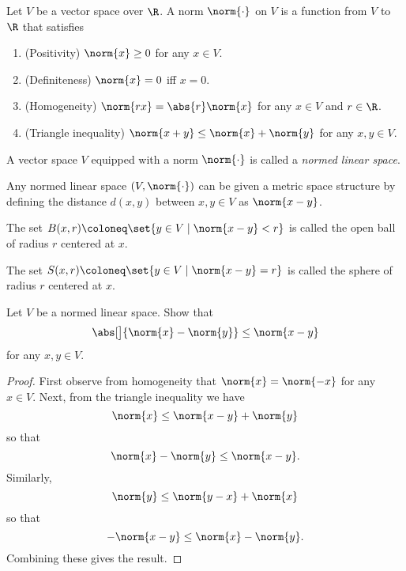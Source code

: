 \begin{definition}[norm] \label{def:norm}
    Let $V$ be a vector space over $\R$.
    A norm $\norm{\cdot}$ on $V$ is a function from $V$ to $\R$ that
    satisfies
    \begin{enumerate}[label=\small(N\arabic*)]
        \item (Positivity) $\norm{x} \ge 0$ for any $x \in V$.
            \label{def:norm:pos}
        \item (Definiteness) $\norm{x} = 0$ iff $x = 0$.
            \label{def:norm:def}
        \item (Homogeneity) $\norm{r x} = \abs{r} \norm{x}$
            for any $x \in V$ and $r \in \R$.
            \label{def:norm:hom}
        \item (Triangle inequality) $\norm{x + y} \le \norm{x} + \norm{y}$
            for any $x, y \in V$.
            \label{def:norm:tri}
    \end{enumerate}
\end{definition}

\begin{definition} \label{def:nls}
    A vector space $V$ equipped with a norm $\norm{\cdot}$ is called
    a \emph{normed linear space}.
\end{definition}

\begin{remark}
    Any normed linear space $(V, \norm{\cdot})$ can be given a metric
    space structure by defining the distance $d(x, y)$ between $x, y \in V$
    as $\norm{x - y}$.

    The set $B(x, r) \coloneq \set{y \in V \mid \norm{x - y} < r}$ is called
    the open ball of radius $r$ centered at $x$.

    The set $S(x, r) \coloneq \set{y \in V \mid \norm{x - y} = r}$ is called
    the sphere of radius $r$ centered at $x$.
\end{remark}

\begin{exercise} \label{thm:rti}
    Let $V$ be a normed linear space.
    Show that \[
        \abs[\big]{\norm{x} - \norm{y}} \le \norm{x - y}
    \] for any $x, y \in V$.
\end{exercise}
\begin{proof}
    First observe from homogeneity  that
    $\norm{x} = \norm{-x}$ for any $x \in V$.
    Next, from the triangle inequality  we have \[
        \norm{x} \le \norm{x - y} + \norm{y}
    \] so that \[
        \norm{x} - \norm{y} \le \norm{x - y}.
    \] Similarly, \[
        \norm{y} \le \norm{y - x} + \norm{x}
    \] so that \[
        -\norm{x - y} \le \norm{x} - \norm{y}.
    \] Combining these gives the result.
\end{proof}

